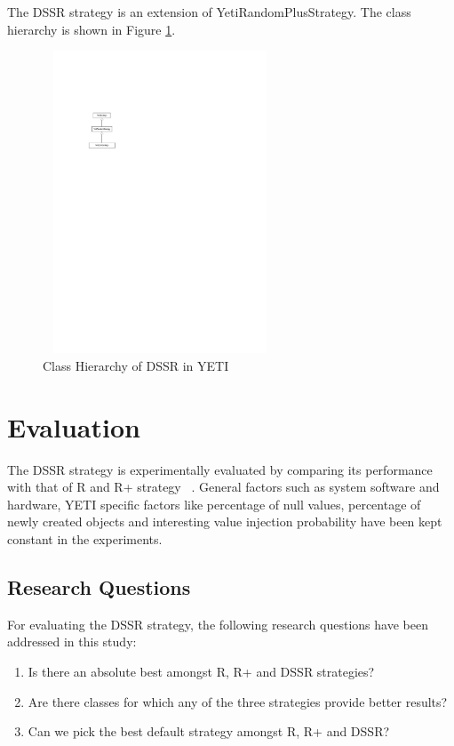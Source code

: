 The DSSR strategy is an extension of YetiRandomPlusStrategy. The class hierarchy is shown in Figure \ref{fig:hierarchyofDSSR}.

\begin{figure}[h]
\centering
\includegraphics[width=7cm,height=9cm]{chapter4/hierarchy.pdf}
\caption{Class Hierarchy of DSSR in YETI}
\label{fig:hierarchyofDSSR}
\end{figure}







\section{Evaluation}\label{sec:eval}

The DSSR strategy is experimentally evaluated by comparing its performance with that of R and R+ strategy ~\cite{leitner2007reconciling}. General factors such as system software and hardware, YETI specific factors like percentage of null values, percentage of newly created objects and interesting value injection probability have been kept constant in the experiments.

\subsection{Research Questions}
For evaluating the DSSR strategy, the following research questions have been addressed in this study:
\begin{enumerate}
\item Is there an absolute best amongst R, R+ and DSSR strategies?
\item Are there classes for which any of the three strategies provide better results?
\item Can we pick the best default strategy amongst R, R+ and DSSR?
\end{enumerate}



